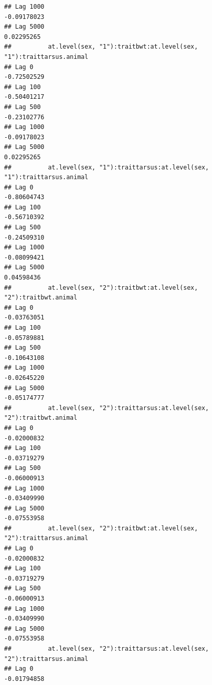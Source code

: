 \documentclass[
  12pt,
]{book}
\begin{document}
\begin{verbatim}
## Lag 1000                                                       -0.09178023
## Lag 5000                                                        0.02295265
##          at.level(sex, "1"):traitbwt:at.level(sex, "1"):traittarsus.animal
## Lag 0                                                          -0.72502529
## Lag 100                                                        -0.50401217
## Lag 500                                                        -0.23102776
## Lag 1000                                                       -0.09178023
## Lag 5000                                                        0.02295265
##          at.level(sex, "1"):traittarsus:at.level(sex, "1"):traittarsus.animal
## Lag 0                                                             -0.80604743
## Lag 100                                                           -0.56710392
## Lag 500                                                           -0.24509310
## Lag 1000                                                          -0.08099421
## Lag 5000                                                           0.04598436
##          at.level(sex, "2"):traitbwt:at.level(sex, "2"):traitbwt.animal
## Lag 0                                                       -0.03763051
## Lag 100                                                     -0.05789881
## Lag 500                                                     -0.10643108
## Lag 1000                                                    -0.02645220
## Lag 5000                                                    -0.05174777
##          at.level(sex, "2"):traittarsus:at.level(sex, "2"):traitbwt.animal
## Lag 0                                                          -0.02000832
## Lag 100                                                        -0.03719279
## Lag 500                                                        -0.06000913
## Lag 1000                                                       -0.03409990
## Lag 5000                                                       -0.07553958
##          at.level(sex, "2"):traitbwt:at.level(sex, "2"):traittarsus.animal
## Lag 0                                                          -0.02000832
## Lag 100                                                        -0.03719279
## Lag 500                                                        -0.06000913
## Lag 1000                                                       -0.03409990
## Lag 5000                                                       -0.07553958
##          at.level(sex, "2"):traittarsus:at.level(sex, "2"):traittarsus.animal
## Lag 0                                                             -0.01794858

\end{verbatim}
\end{document}
